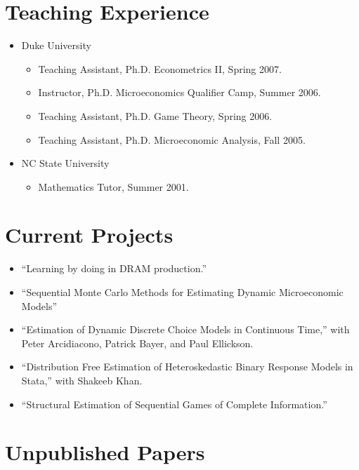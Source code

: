 \documentclass[overlapped,line,letterpaper]{res}
\begin{document}
\begin{resume}
\section{\bf Teaching Experience}

\begin{itemize}
\item Duke University
  \begin{itemize}
  \item Teaching Assistant, Ph.D. Econometrics II, Spring 2007.
  \item Instructor, Ph.D. Microeconomics Qualifier Camp, Summer 2006.
  \item Teaching Assistant, Ph.D. Game Theory, Spring 2006.
  \item Teaching Assistant, Ph.D. Microeconomic Analysis, Fall 2005.
  \end{itemize}

\item NC State University
  \begin{itemize}
  \item Mathematics Tutor, Summer 2001.
  \end{itemize}
\end{itemize}

\section{\bf Current Projects}

\begin{itemize}
\item ``Learning by doing in DRAM production.''
\item ``Sequential Monte Carlo Methods for Estimating Dynamic
  Microeconomic Models''
\item ``Estimation of Dynamic Discrete Choice Models in Continuous
  Time,'' with Peter Arcidiacono, Patrick Bayer, and Paul Ellickson.
\item ``Distribution Free Estimation of Heteroskedastic Binary Response
  Models in Stata,'' with Shakeeb Khan.
\item ``Structural Estimation of Sequential Games of Complete Information.''
\end{itemize}

\section{\bf Unpublished Papers}


\end{resume}
\end{document}
